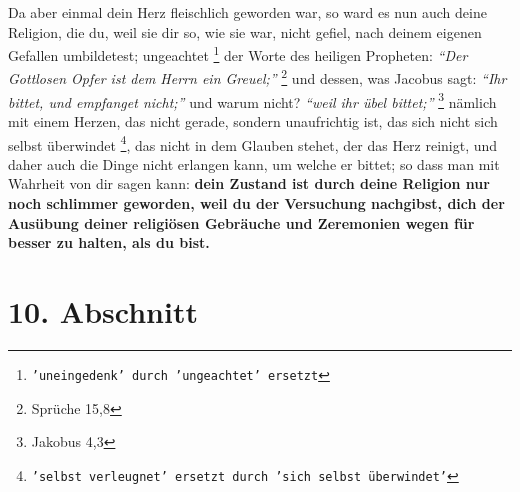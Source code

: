 \medskip 

Da aber einmal dein Herz fleischlich geworden war, so ward es nun auch deine
Religion, die du, weil sie dir so, wie sie war, nicht gefiel, nach deinem
eigenen Gefallen umbildetest; ungeachtet
\footnote{\texttt{'uneingedenk' durch 'ungeachtet' ersetzt}}
der Worte des heiligen Propheten:
\textit{"`Der Gottlosen Opfer ist dem Herrn ein Greuel;"'}
\footnote{Sprüche 15,8}
 und
dessen, was Jacobus sagt:
\textit{"`Ihr bittet, und empfanget nicht;"'} und warum
nicht? \textit{"`weil ihr übel bittet;"'}
\footnote{Jakobus 4,3}
 nämlich mit einem
Herzen, das nicht gerade, sondern unaufrichtig ist, das sich nicht sich
selbst überwindet
\footnote{\texttt{'selbst verleugnet' ersetzt durch 'sich selbst überwindet'}},
das nicht in dem Glauben stehet, der das Herz reinigt,
und daher
auch die Dinge nicht erlangen kann, um welche er bittet; so dass man mit
Wahrheit von dir sagen kann: \label{ref:02_09_selbstueberschaetzung}
\textbf{dein Zustand ist durch deine Religion nur noch
schlimmer geworden, weil du der Versuchung nachgibst, dich der Ausübung
deiner religiösen Gebräuche und Zeremonien wegen für besser zu halten, als du
bist.}

\section{10. Abschnitt}  \label{kap2_ab10}

